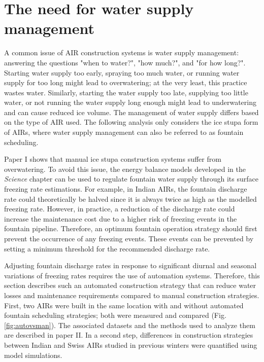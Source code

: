 \section{The need for water supply management}

A common issue of \ac{AIR} construction systems is water supply management: answering the questions "when to
water?", "how much?", and "for how long?". Starting water supply too early, spraying too much water, or
running water supply for too long might lead to overwatering; at the very least, this practice wastes water.
Similarly, starting the water supply too late, supplying too little water, or not running the water supply long
enough might lead to underwatering and can cause reduced ice volume. The management of water supply
differs based on the type of \ac{AIR} used. The following analysis only considers the ice stupa
form of \ac{AIRs}, where water supply management can also be referred to as fountain scheduling.

Paper I shows that manual ice stupa construction systems suffer from overwatering. To avoid this issue, the
energy balance models developed in the \textit{Science} chapter can be used to regulate fountain water supply
through its surface freezing rate estimations. For example, in Indian \ac{AIRs}, the fountain discharge rate could
theoretically be halved since it is always twice as high as the modelled freezing rate. However, in practice, a
reduction of the discharge rate could increase the maintenance cost due to a higher risk of freezing events in
the fountain pipeline. Therefore, an optimum fountain operation strategy should first prevent the occurrence of
any freezing events. These events can be prevented by setting a minimum threshold for the recommended discharge
rate.

Adjusting fountain discharge rates in response to significant diurnal and seasonal variations of freezing rates
requires the use of automation systems. Therefore, this section describes such an automated construction
strategy that can reduce water losses and maintenance requirements compared to manual construction strategies.
First, two \ac{AIRs} were built in the same location with and without automated fountain scheduling strategies; both
were measured and compared (Fig. \ref{fig:autovsman}). The associated datasets and the methods used to analyze
them are described in paper II. In a second step, differences in construction strategies between Indian and
Swiss \ac{AIRs} studied in previous winters were quantified using model simulations. 

